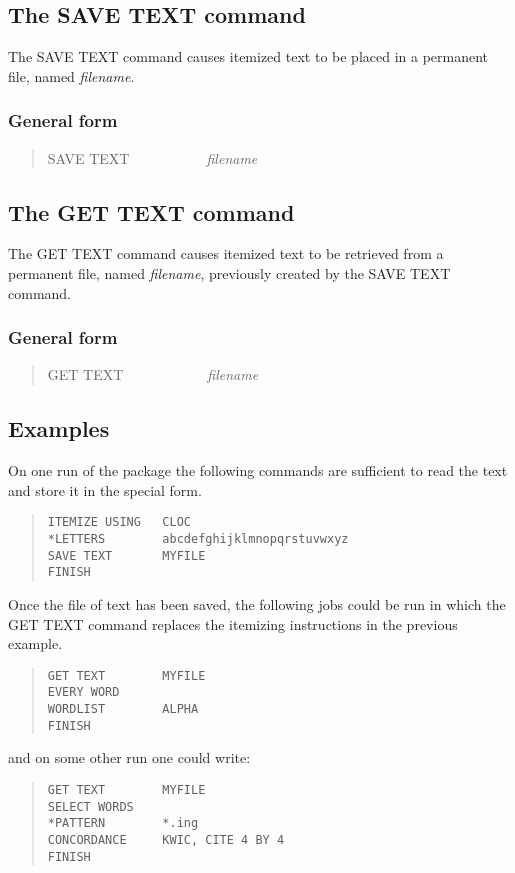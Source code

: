 \subsection{The SAVE TEXT command}
The SAVE TEXT command causes itemized text to be placed in a
permanent file, named {\em filename}.

\subsubsection{General form}
\begin{quote}
SAVE TEXT~~~~~~~~~~~{\em filename}
\end{quote}

\subsection{The GET TEXT command}
The GET TEXT command causes itemized text to be retrieved from
a permanent file, named {\em filename}, previously created by the SAVE TEXT
command.

\subsubsection{General form}
\begin{quote}
GET TEXT~~~~~~~~~~~~{\em filename}
\end{quote}

\subsection{Examples}
On one run of the package the following commands are sufficient to
read the text and store it in the special form.
\begin{quote}
\begin{verbatim}
ITEMIZE USING   CLOC
*LETTERS        abcdefghijklmnopqrstuvwxyz
SAVE TEXT       MYFILE
FINISH
\end{verbatim}
\end{quote}

Once the file of text has been saved, the following jobs could be run
in which the GET TEXT command replaces the itemizing instructions
in the previous example.
\begin{quote}
\begin{verbatim}
GET TEXT        MYFILE
EVERY WORD
WORDLIST        ALPHA
FINISH
\end{verbatim}
\end{quote}
and on some other run one could write:
\begin{quote}
\begin{verbatim}
GET TEXT        MYFILE
SELECT WORDS
*PATTERN        *.ing
CONCORDANCE     KWIC, CITE 4 BY 4
FINISH
\end{verbatim}
\end{quote}

